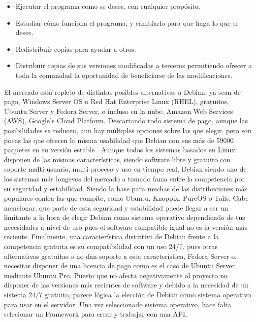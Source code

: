 \begin{itemize}
	\item Ejecutar el programa como se desee, con cualquier propósito.
	\item Estudiar cómo funciona el programa, y cambiarlo para que haga lo que se desee.
	\item Redistribuir copias para ayudar a otros.
	\item Distribuir copias de sus versiones modificadas a terceros permitiendo ofrecer a toda la comunidad la oportunidad de beneficiarse de las modificaciones.
\end{itemize}

El mercado está repleto de distintas posibles alternativas a Debian, ya sean de pago, Windows Server OS o Red Hat Enterprise Linux (RHEL), gratuitos, Ubuntu Server y Fedora Server, o incluso en la nube, Amazon Web Services (AWS), Google’s Cloud Platform.
\newline
\newline
Descartando todo sistema de pago, aunque las posibilidades se reducen, aun hay múltiples opciones sobre las que elegir, pero son pocas las que ofrecen la misma usabilidad que Debian con sus más de 59000 paquetes en su versión estable \cite{DebWhy}.
\newline
\newline
Aunque todos los sistemas basados en Linux disponen de las mismas características, siendo software libre y gratuito con soporte multi-usuario, multi-proceso y uso en tiempo real, Debian siendo uno de los sistemas más longevos del mercado a tomado fama entre la competencia por su seguridad y estabilidad. Siendo la base para muchas de las distribuciones más populares contra las que compite, como Ubuntu, Knoppix, PureOS o Tails.
\newline
\newline
Cabe mencionar, que parte de esta seguridad y estabilidad puede llegar a ser un limitante a la hora de elegir Debian como sistema operativo dependiendo de tus necesidades a nivel de uso pues el software compatible igual no es la versión más reciente.
\newline
\newline
Finalmente, una característica distintiva de Debian frente a la competencia gratuita es su compatibilidad con un uso 24/7, pues otras alternativas gratuitas o no dan soporte a esta característica, Fedora Server o, necesitas disponer de una licencia de pago como es el caso de Ubuntu Server mediante Ubuntu Pro.
\newline
\newline
Puesto que no afecta negativamente al proyecto no disponer de las versiones más recientes de software y debido a la necesidad de un sistema 24/7 gratuito, parece lógica la elección de Debian como sistema operativo para usar en el servidor.\newline
\newline
Una vez seleccionado sistema operativo, hace falta selecionar un Framework para crear y trabajar con una API.

